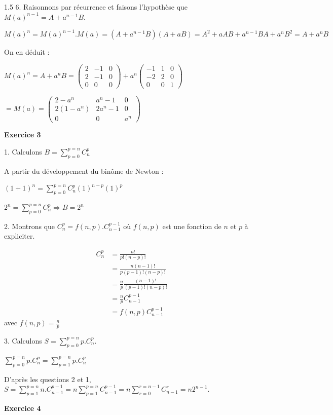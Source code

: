 \documentclass[12pt]{article}
\begin{document}
\begin{spacing}{1.5}
6. Raisonnons par récurrence et faisons l'hypothèse que $M(a)^{n-1} = A +a^{n-1}B.$

$M(a)^n=M(a)^{n-1}.M(a)=(A +a^{n-1}B)(A +aB)= A^2 + aAB + a^{n-1}BA + a^nB^2 = A + a^nB$

On en déduit :

$M(a)^n=A + a^nB=\begin{pmatrix}
2 & -1 & 0 \\ 
2 & -1 & 0 \\ 
0 & 0 & 0
\end{pmatrix} + a^n \begin{pmatrix}
-1 & 1 & 0 \\ 
-2 & 2 & 0 \\ 
0 & 0 & 1
\end{pmatrix}$

$=M(a)=\begin{pmatrix}
2-a^n & a^n-1  &0 \\
2(1-a^n) & 2a^n-1&0\\
0&0&a^n
\end{pmatrix}$


\medskip\textbf{Exercice 3}

1. Calculons $B = \sum_{p=0}^{p=n}C_{n}^{p}$

 A partir du développement du binôme de Newton :
 
$(1 + 1)^n = \sum_{p=0}^{p=n}C_{n}^{p}(1)^{n-p}(1)^{p} $

$2^n=\sum_{p=0}^{p=n}C_{n}^{p}\Longrightarrow B=2^n$
 
 2. Montrons que $C_{n}^{p}=f(n,p).C_{n-1}^{p-1}$ où $f(n,p)$ est une fonction de $n$ et $p$ à expliciter. 
 
 \begin{align*}
C_{n}^{p}&=\frac{n!}{p!(n-p)!}\\
		&=\frac{n(n-1)!}{p(p-1)!(n-p)!}\\
		&=\frac{n}{p}\frac{(n-1)!}{(p-1)!(n-p)!}\\
		&=\frac{n}{p}C_{n-1}^{p-1}\\
		&=f(n,p)C_{n-1}^{p-1}
\end{align*} avec $f(n,p)=\frac{n}{p}$

3. Calculons $S = \sum_{p=0}^{p=n}p.C_{n}^{p}$.

$\sum_{p=0}^{p=n}p.C_{n}^{p}=\sum_{p=1}^{p=n}p.C_{n}^{p}$

D'après les questions 2 et 1, $S=\sum_{p=1}^{p=n}n.C_{n-1}^{p-1}=n\sum_{p=1}^{p=n}C_{n-1}^{p-1}=n\sum_{r=0}^{r=n-1}C_{n-1}^{r}=n2^{n-1}$.

\medskip\textbf{Exercice 4}


\end{spacing}
\end{document}
